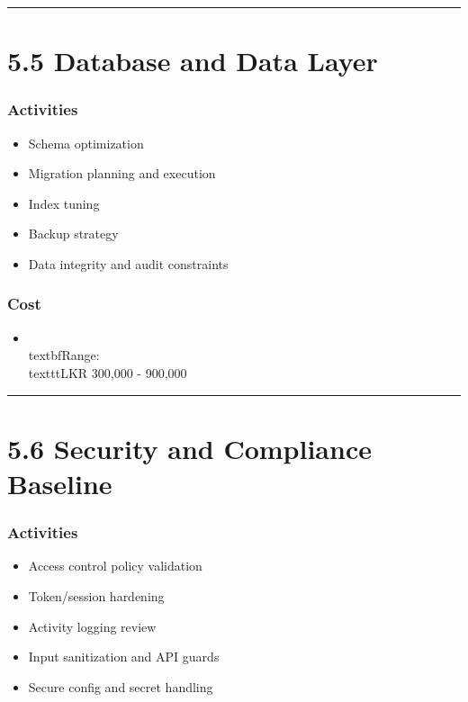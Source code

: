 \documentclass[11pt,a4paper]{article}
\begin{document}
\bigskip\hrule\bigskip

\section{5.5 Database and Data Layer}

\subsubsection{Activities}

\begin{itemize}
\item Schema optimization
\item Migration planning and execution
\item Index tuning
\item Backup strategy
\item Data integrity and audit constraints
\end{itemize}

\subsubsection{Cost}

\begin{itemize}
\item \\textbf{Range:} \\texttt{LKR 300,000 - 900,000}
\end{itemize}

\bigskip\hrule\bigskip

\section{5.6 Security and Compliance Baseline}

\subsubsection{Activities}

\begin{itemize}
\item Access control policy validation
\item Token/session hardening
\item Activity logging review
\item Input sanitization and API guards
\item Secure config and secret handling
\end{itemize}
\end{document}
